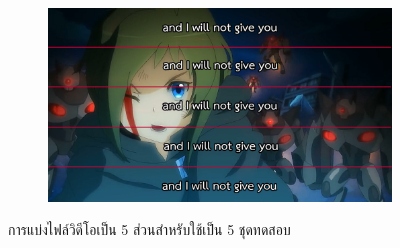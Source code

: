 \begin{figure}[H]
    \centering
    \begin{subfigure}{0.8\linewidth}
        \centering
        \includegraphics[width=0.8\linewidth]{image/inori-subbed-preview.png}
    \end{subfigure}
    \caption{การแบ่งไฟล์วิดีโอเป็น 5 ส่วนสำหรับใช้เป็น 5 ชุดทดสอบ}
\end{figure}